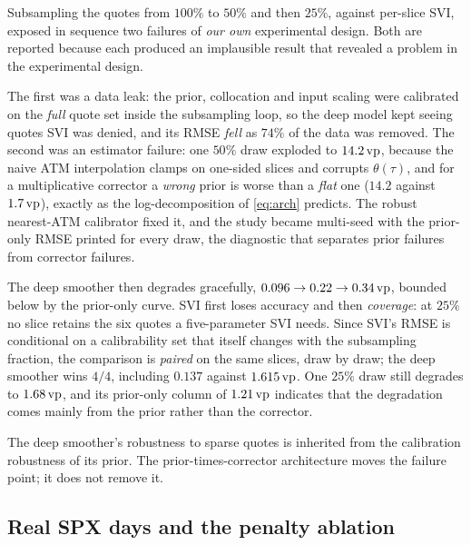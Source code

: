 Subsampling the quotes from $100\%$ to $50\%$ and then $25\%$, against per-slice SVI, exposed in
sequence two failures of \emph{our own} experimental design. Both are reported because each
produced an implausible result that revealed a problem in the experimental design.

The first was a data leak: the prior, collocation and input scaling were calibrated on the
\emph{full} quote set inside the subsampling loop, so the deep model kept seeing quotes SVI was
denied, and its RMSE \emph{fell} as $74\%$ of the data was removed. The second was an estimator
failure: one $50\%$ draw exploded to $14.2\,\text{vp}$, because the naive ATM interpolation clamps on
one-sided slices and corrupts $\theta(\tau)$, and for a multiplicative corrector a \emph{wrong}
prior is worse than a \emph{flat} one ($14.2$ against $1.7\,\text{vp}$), exactly as the
log-decomposition of \eqref{eq:arch} predicts. The robust nearest-ATM calibrator fixed it, and
the study became multi-seed with the prior-only RMSE printed for every draw, the diagnostic that
separates prior failures from corrector failures.

The deep smoother then degrades gracefully, $0.096\to0.22\to0.34\,\text{vp}$, bounded below by the
prior-only curve. SVI first loses accuracy and then \emph{coverage}: at $25\%$ no slice retains
the six quotes a five-parameter SVI needs. Since SVI's RMSE is conditional on a calibrability
set that itself changes with the subsampling fraction, the comparison is \emph{paired} on the
same slices, draw by draw; the deep smoother wins $4/4$, including $0.137$ against
$1.615\,\text{vp}$. One $25\%$ draw still degrades to $1.68\,\text{vp}$, and its prior-only column of
$1.21\,\text{vp}$ indicates that the degradation comes mainly from the prior rather than the corrector.

\begin{finding}\label{find:sparsity}
The deep smoother's robustness to sparse quotes is inherited from the calibration robustness of
its prior. The prior-times-corrector architecture moves the failure point; it does not remove it.
\end{finding}

\subsection{Real SPX days and the penalty ablation}\label{sec:realablation}

